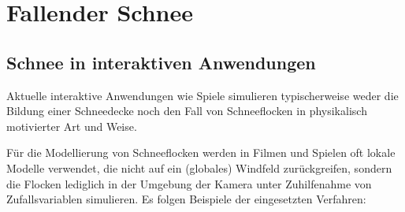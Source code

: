 \section{Fallender Schnee}
\label{sec:implementation_snowflake}

\subsection{Schnee in interaktiven Anwendungen}

Aktuelle interaktive Anwendungen wie Spiele simulieren typischerweise
weder die Bildung einer Schneedecke noch den Fall von Schneeflocken in
physikalisch motivierter Art und Weise.

Für die Modellierung von Schneeflocken werden in Filmen und Spielen
oft lokale Modelle verwendet, die nicht auf ein (globales) Windfeld
zurückgreifen, sondern die Flocken lediglich in der Umgebung der Kamera
unter Zuhilfenahme von Zufallsvariablen simulieren. Es folgen
Beispiele der eingesetzten Verfahren:

